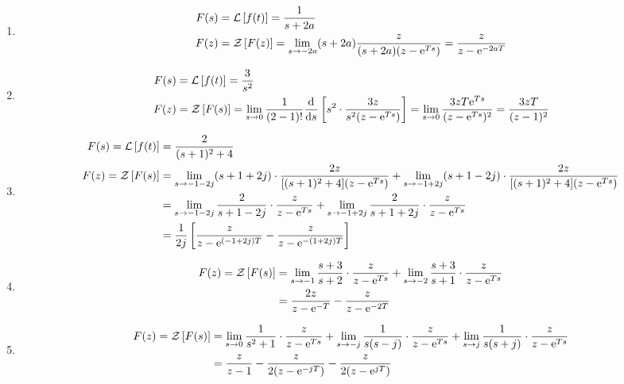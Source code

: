 \begin{exercise} %
    \begin{enumerate}
        \item \begin{align*}
            F(s)&= \mathcal{L}\left[f(t)\right] = \frac{1}{s+2a} \\
            F(z)&= \mathcal{Z}\left[F(z)\right] = \lim_{s \to -2a} (s+2a) \frac{z}{(s+2a)(z-{\rm e}^{Ts})} = \frac{z}{z-{\rm e}^{-2aT}}
        \end{align*}
        \item \begin{align*}
            F(s)&= \mathcal{L}\left[f(t)\right] = \frac{3}{s^2} \\
            F(z)&= \mathcal{Z}\left[F(s)\right] = \lim_{s \to 0} \frac{1}{(2-1)!} \frac{{\rm{d}}^{}}{{\rm{d}}{s}^{}} \left[s^2 \cdot \frac{3z}{s^2 (z - {\rm e}^{Ts})}\right] = \lim_{s \to 0} \frac{3z T{\rm e}^{Ts}}{(z-{\rm e}^{Ts})^2} = \frac{3zT}{(z-1)^2}
        \end{align*}
        \item \begin{align*}
            F(s) = \mathcal{L}\left[f(t)\right] &= \frac{2}{(s+1)^2 + 4} \\
            F(z) = \mathcal{Z}\left[F(s)\right] &= \lim_{s \to -1-2j} (s+1+2j)\cdot \frac{2z}{[(s+1)^2+4] (z-{\rm e}^{Ts})} + \lim_{s \to -1+2j} (s+1-2j)\cdot \frac{2z}{[(s+1)^2+4] (z-{\rm e}^{Ts})} \\
                &= \lim_{s \to -1-2j} \frac{2}{s+1-2j} \cdot \frac{z}{z-{\rm e}^{Ts}} + \lim_{s \to -1+2j} \frac{2}{s+1+2j} \cdot \frac{z}{z-{\rm e}^{Ts}} \\
                &= \frac{1}{2j} \left[\frac{z}{z-{\rm e}^{(-1+2j)T}} - \frac{z}{z-{\rm e}^{-(1+2j)T}}\right]
        \end{align*}
        \item \begin{align*}
            F(z) = \mathcal{Z}\left[F(s)\right] &= \lim_{s \to -1} \frac{s+3}{s+2} \cdot \frac{z}{z-{\rm e}^{Ts}} + \lim_{s \to -2} \frac{s+3}{s+1} \cdot \frac{z}{z-{\rm e}^{Ts}} \\
            &= \frac{2z}{z-{\rm e}^{-T}} - \frac{z}{z-{\rm e}^{-2T}}
        \end{align*}
        \item \begin{align*}
            F(z) = \mathcal{Z}\left[F(s)\right] &= \lim_{s \to 0} \frac{1}{s^2+1} \cdot \frac{z}{z-{\rm e}^{Ts}} + \lim_{s \to -j} \frac{1}{s(s-j)} \cdot \frac{z}{z-{\rm e}^{Ts}} + \lim_{s \to j} \frac{1}{s(s+j)} \cdot \frac{z}{z-{\rm e}^{Ts}} \\
            &= \frac{z}{z-1} - \frac{z}{2(z-{\rm e}^{-jT})} - \frac{z}{2(z-{\rm e}^{jT})}
        \end{align*}
    \end{enumerate}
\end{exercise}

